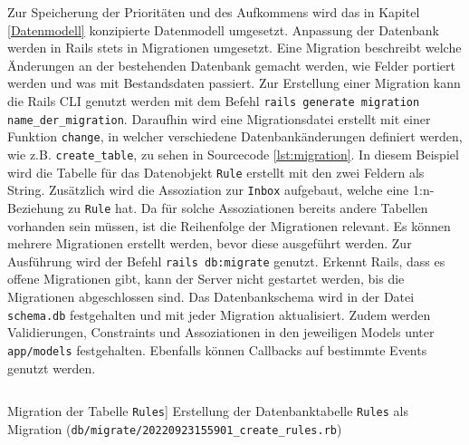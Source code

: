 \noindent Zur Speicherung der Prioritäten und des Aufkommens wird das in Kapitel \ref{Datenmodell} konzipierte Datenmodell umgesetzt. Anpassung der Datenbank werden in Rails stets in Migrationen umgesetzt. Eine Migration beschreibt welche Änderungen an der bestehenden Datenbank gemacht werden, wie Felder portiert werden und was mit Bestandsdaten passiert. Zur Erstellung einer Migration kann die Rails CLI genutzt werden mit dem Befehl \texttt{rails generate migration name\_der\_migration}. Daraufhin wird eine Migrationsdatei erstellt mit einer Funktion \texttt{change}, in welcher verschiedene Datenbankänderungen definiert werden, wie z.B. \texttt{create\_table}, zu sehen in Sourcecode \ref{lst:migration}. In diesem Beispiel wird die Tabelle für das Datenobjekt \texttt{Rule} erstellt mit den zwei Feldern als String. Zusätzlich wird die Assoziation zur \texttt{Inbox} aufgebaut, welche eine 1:n-Beziehung zu \texttt{Rule} hat. Da für solche Assoziationen bereits andere Tabellen vorhanden sein müssen, ist die Reihenfolge der Migrationen relevant. Es können mehrere Migrationen erstellt werden, bevor diese ausgeführt werden. Zur Ausführung wird der Befehl \texttt{rails db:migrate} genutzt. Erkennt Rails, dass es offene Migrationen gibt, kann der Server nicht gestartet werden, bis die Migrationen abgeschlossen sind. Das Datenbankschema wird in der Datei \texttt{schema.db} festgehalten und mit jeder Migration aktualisiert. Zudem werden Validierungen, Constraints und Assoziationen in den jeweiligen Models unter \texttt{app/models} festgehalten. Ebenfalls können Callbacks auf bestimmte Events genutzt werden.

\begin{listing}[!ht]
\inputminted[linenos]{ruby}{Listings/Pkg1/20220923155901_create_rules.rb}

\caption
    [Migration der Tabelle \texttt{Rules}]
    {Erstellung der Datenbanktabelle \texttt{Rules} als Migration (\texttt{db/migrate/20220923155901\_create\_rules.rb})}

\label{lst:migration}
\end{listing}

